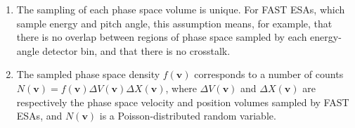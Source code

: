   \begin{enumerate}

  \item The sampling of each phase space volume is unique. For FAST
    ESAs, which sample energy and pitch angle, this assumption means,
    for example, that there is no overlap between regions of phase
    space sampled by each energy-angle detector bin, and that there is
    no crosstalk.

  \item The sampled phase space density $f(\mathbf{v})$ corresponds to
    a number of counts $N(\mathbf{v}) = f(\mathbf{v}) \Delta
    V(\mathbf{v})\Delta X(\mathbf{v})$, where $\Delta V(\mathbf{v})$
    and $\Delta X (\mathbf{v})$ are respectively the phase space
    velocity and position volumes sampled by FAST ESAs, and
    $N(\mathbf{v})$ is a Poisson-distributed random variable.

  \end{enumerate}

